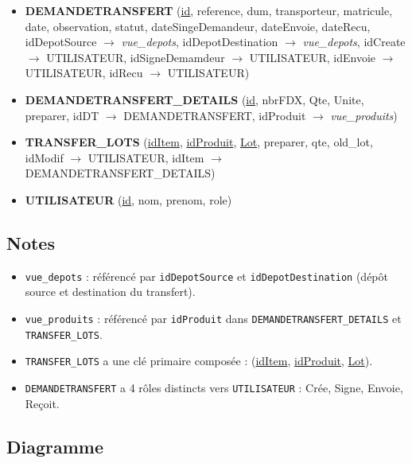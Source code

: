 \documentclass[12pt,a4paper]{article}
\begin{document}
\begin{itemize}[leftmargin=1.5em]
\item \textbf{DEMANDETRANSFERT} (\underline{id}, reference, dum, transporteur, matricule, date, observation, statut, dateSingeDemandeur, dateEnvoie, dateRecu, idDepotSource $\rightarrow$ \textit{vue\_depots}, idDepotDestination $\rightarrow$ \textit{vue\_depots}, idCreate $\rightarrow$ UTILISATEUR, idSigneDemamdeur $\rightarrow$ UTILISATEUR, idEnvoie $\rightarrow$ UTILISATEUR, idRecu $\rightarrow$ UTILISATEUR)
\item \textbf{DEMANDETRANSFERT\_DETAILS} (\underline{id}, nbrFDX, Qte, Unite, preparer, idDT $\rightarrow$ DEMANDETRANSFERT, idProduit $\rightarrow$ \textit{vue\_produits})
\item \textbf{TRANSFER\_LOTS} (\underline{idItem}, \underline{idProduit}, \underline{Lot}, preparer, qte, old\_lot, idModif $\rightarrow$ UTILISATEUR, idItem $\rightarrow$ DEMANDETRANSFERT\_DETAILS)
\item \textbf{UTILISATEUR} (\underline{id}, nom, prenom, role)
\end{itemize}

\subsection{Notes}
\begin{itemize}[leftmargin=1.5em]
\item \texttt{vue\_depots} : référencé par \texttt{idDepotSource} et \texttt{idDepotDestination} (dépôt source et destination du transfert).
\item \texttt{vue\_produits} : référencé par \texttt{idProduit} dans \texttt{DEMANDETRANSFERT\_DETAILS} et \texttt{TRANSFER\_LOTS}.
\item \texttt{TRANSFER\_LOTS} a une clé primaire composée : (\underline{idItem}, \underline{idProduit}, \underline{Lot}).
\item \texttt{DEMANDETRANSFERT} a 4 rôles distincts vers \texttt{UTILISATEUR} : Crée, Signe, Envoie, Reçoit.
\end{itemize}

\subsection{Diagramme}
\end{document}
